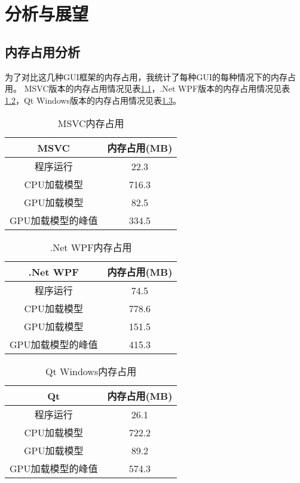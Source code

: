 \chapter{分析与展望}
\label{chapter:12}

\section{内存占用分析}

为了对比这几种GUI框架的内存占用，我统计了每种GUI的每种情况下的内存占用。
MSVC版本的内存占用情况见表\ref{tab:memory_msvc}，.Net WPF版本的内存占用情况见表\ref{tab:memory_dotnet}，Qt Windows版本的内存占用情况见表\ref{tab:memory_qt_windows}。

\begin{table}[!ht]
	\centering
	\caption{MSVC内存占用}
	\begin{tabular}{cc}
		\hline
		MSVC & 内存占用(MB) \\ \hline
		程序运行 & 22.3 \\
		CPU加载模型 & 716.3 \\
		GPU加载模型 & 82.5 \\
		GPU加载模型的峰值 & 334.5 \\ \hline
	\end{tabular}
	\label{tab:memory_msvc}
\end{table}

\begin{table}[!ht]
	\centering
	\caption{.Net WPF内存占用}
	\begin{tabular}{cc}
		\hline
		.Net WPF & 内存占用(MB) \\ \hline
		程序运行 & 74.5 \\
		CPU加载模型 & 778.6 \\
		GPU加载模型 & 151.5 \\
		GPU加载模型的峰值 & 415.3 \\ \hline
	\end{tabular}
	\label{tab:memory_dotnet}
\end{table}

\begin{table}[!ht]
	\centering
	\caption{Qt Windows内存占用}
	\begin{tabular}{cc}
		\hline
		Qt & 内存占用(MB) \\ \hline
		程序运行 & 26.1 \\
		CPU加载模型 & 722.2 \\
		GPU加载模型 & 89.2 \\
		GPU加载模型的峰值 & 574.3 \\ \hline
	\end{tabular}
	\label{tab:memory_qt_windows}
\end{table}

